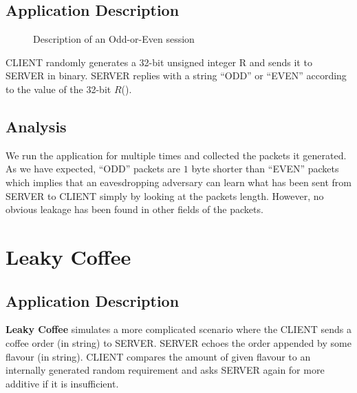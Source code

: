 \subsection{Application Description}

\begin{figure}[H] 
\centering
\resizebox{8cm}{!}
{}
\caption{Description of an Odd-or-Even session}
\label{Fig: Odd or Even}
\end{figure}

CLIENT randomly generates a 32-bit unsigned integer R and sends it to SERVER in binary. SERVER replies with a string “ODD'' or “EVEN” according to the value of the 32-bit $R$().

\subsection{Analysis}
We run the application for multiple times and collected the packets it generated. As we have expected, “ODD” packets are $1$ byte shorter than “EVEN” packets which implies that an eavesdropping adversary can learn what has been sent from SERVER to CLIENT simply by looking at the packets length. However, no obvious leakage has been found in other fields of the packets.

%
%
%
%
%

\section{Leaky Coffee}
\label{Sec: Leaky Coffee}

\subsection{Application Description}
\textbf{Leaky Coffee} simulates a more complicated scenario where the CLIENT sends a coffee order (in string) to SERVER. SERVER echoes the order appended by some flavour (in string). CLIENT compares the amount of given flavour to an internally generated random requirement and asks SERVER again for more additive if it is insufficient.

